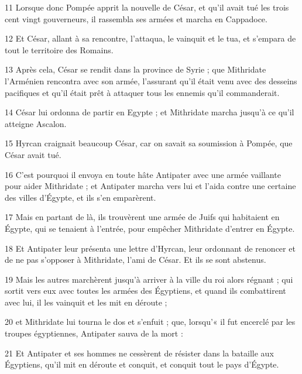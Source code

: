 \par 11 Lorsque donc Pompée apprit la nouvelle de César, et qu'il avait tué les trois cent vingt gouverneurs, il rassembla ses armées et marcha en Cappadoce.

\par 12 Et César, allant à sa rencontre, l'attaqua, le vainquit et le tua, et s'empara de tout le territoire des Romains.

\par 13 Après cela, César se rendit dans la province de Syrie ; que Mithridate l'Arménien rencontra avec son armée, l'assurant qu'il était venu avec des desseins pacifiques et qu'il était prêt à attaquer tous les ennemis qu'il commanderait.

\par 14 César lui ordonna de partir en Egypte ; et Mithridate marcha jusqu'à ce qu'il atteigne Ascalon.

\par 15 Hyrcan craignait beaucoup César, car on savait sa soumission à Pompée, que César avait tué.

\par 16 C'est pourquoi il envoya en toute hâte Antipater avec une armée vaillante pour aider Mithridate ; et Antipater marcha vers lui et l'aida contre une certaine des villes d'Égypte, et ils s'en emparèrent.

\par 17 Mais en partant de là, ils trouvèrent une armée de Juifs qui habitaient en Égypte, qui se tenaient à l'entrée, pour empêcher Mithridate d'entrer en Égypte.

\par 18 Et Antipater leur présenta une lettre d'Hyrcan, leur ordonnant de renoncer et de ne pas s'opposer à Mithridate, l'ami de César. Et ils se sont abstenus.

\par 19 Mais les autres marchèrent jusqu'à arriver à la ville du roi alors régnant ; qui sortit vers eux avec toutes les armées des Égyptiens, et quand ils combattirent avec lui, il les vainquit et les mit en déroute ;

\par 20 et Mithridate lui tourna le dos et s'enfuit ; que, lorsqu'« il fut encerclé par les troupes égyptiennes, Antipater sauva de la mort :

\par 21 Et Antipater et ses hommes ne cessèrent de résister dans la bataille aux Égyptiens, qu'il mit en déroute et conquit, et conquit tout le pays d'Égypte.

